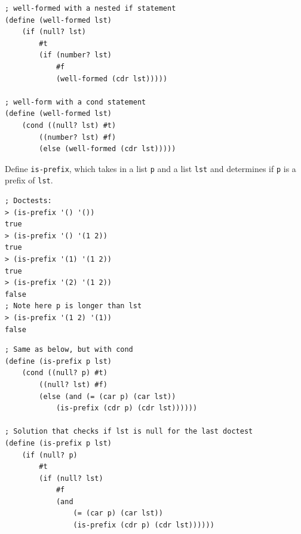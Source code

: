 \documentclass{exam}
\begin{document}
\begin{questions}
\begin{blocksection}
\begin{solution}[0.75in]
\begin{lstlisting}
; well-formed with a nested if statement
(define (well-formed lst)
    (if (null? lst)
        #t
        (if (number? lst)
            #f
            (well-formed (cdr lst)))))

; well-form with a cond statement
(define (well-formed lst)
    (cond ((null? lst) #t)
        ((number? lst) #f)
        (else (well-formed (cdr lst)))))
\end{lstlisting}
\end{solution}
\end{blocksection}

\begin{blocksection}
\question Define \texttt{is-prefix}, which takes in a list \texttt{p} and a list \texttt{lst} and determines if \texttt{p} is a prefix of \texttt{lst}.

\begin{lstlisting}
; Doctests:
> (is-prefix '() '())
true
> (is-prefix '() '(1 2))
true
> (is-prefix '(1) '(1 2))
true
> (is-prefix '(2) '(1 2))
false
; Note here p is longer than lst
> (is-prefix '(1 2) '(1))
false
\end{lstlisting}

\begin{solution}[0.5in]
\begin{lstlisting}
; Same as below, but with cond
(define (is-prefix p lst)
    (cond ((null? p) #t)
        ((null? lst) #f)
        (else (and (= (car p) (car lst))
            (is-prefix (cdr p) (cdr lst))))))

; Solution that checks if lst is null for the last doctest
(define (is-prefix p lst)
    (if (null? p)
        #t
        (if (null? lst)
            #f
            (and
                (= (car p) (car lst))
                (is-prefix (cdr p) (cdr lst))))))
\end{lstlisting}
\end{solution}
\end{blocksection}

\end{questions}

\end{document}
